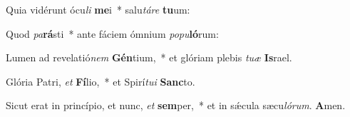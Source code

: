 \item Quia vidérunt ócu\textit{li} \textbf{me}i~* salu\hspace{0.03em}\textit{táre} \textbf{tu}um:
\item Quod \textit{pa}\textbf{rá}sti~* ante fáciem ómnium \textit{popu}\textbf{ló}rum:
\item Lumen ad revelatió\textit{nem} \textbf{Gén}tium,~* et glóriam plebis \textit{tuæ} \textbf{Is}rael.
\item Glória Patri, \textit{et} \textbf{Fí}lio,~* et Spirí\textit{tui} \textbf{Sanc}to.
\item Sicut erat in princípio, et nunc, \textit{et} \textbf{sem}per,~* et in sǽcula sæcu\hspace{0.03em}\textit{lórum}. \textbf{A}men.

